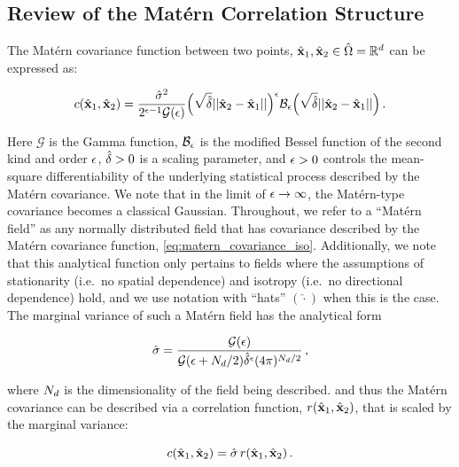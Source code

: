 \subsection{Review of the Mat\'ern Correlation Structure}
\label{ssec:matern_review}

The Mat\'ern covariance function between two points, $\hat{\mathbf{x}}_1,\hat{\mathbf{x}}_2\in\hat{\Omega} =
\mathbb{R}^{d}$ can be expressed as:
\begin{linenomath*}\begin{equation}
    c(\hat{\mathbf{x}}_1,\hat{\mathbf{x}}_2) = \dfrac{\hat{\sigma}^2}{2^{\epsilon-1}
    \mathcal{G}(\epsilon)}
    \Big(\sqrt{\hat{\delta}} ||\hat{\mathbf{x}}_2-\hat{\mathbf{x}}_1||\Big)^{\epsilon}
    \mathcal{B}_{\epsilon}
    \Big(\sqrt{\hat{\delta}} ||\hat{\mathbf{x}}_2-\hat{\mathbf{x}}_1||\Big) \, .
    \label{eq:matern_covariance_iso}
\end{equation}\end{linenomath*}
Here
$\mathcal{G}$ is the Gamma function,
$\mathcal{B}_{\epsilon}$ is the modified
Bessel function of the second kind and order $\epsilon$,
$\hat{\delta}>0$ is a scaling parameter, and $\epsilon>0$
controls the mean-square differentiability of the underlying statistical process
described by the Mat\'ern covariance.
We note that in the limit of $\epsilon\rightarrow\infty$, the Mat\'ern-type
covariance becomes a classical Gaussian.
Throughout, we refer to a ``Mat\'ern field'' as any normally distributed field that has
covariance described by the Mat\'ern covariance function,
\cref{eq:matern_covariance_iso}.
Additionally, we note that this analytical function only pertains to fields where the
assumptions of stationarity (i.e.\ no spatial dependence) and isotropy (i.e.\ no
directional dependence) hold, and we use notation with ``hats'' $(\hat{\cdot})$
when this is the case.
The marginal variance of such a Mat\'ern field has the analytical form
\begin{linenomath*}\begin{equation}
    \hat{\sigma} = \dfrac{\mathcal{G}(\epsilon)}{
        \mathcal{G}(\epsilon + N_{d}/2)
        \hat{\delta}^{\epsilon}
        (4\pi)^{N_{d}/2}
    } \, ,
    \label{eq:matern_variance}
\end{equation}\end{linenomath*}
where $N_{d}$ is the dimensionality of the field being described.
and thus the Mat\'ern covariance can be described via a correlation
function, $r(\hat{\mathbf{x}}_1, \hat{\mathbf{x}}_2)$, that is scaled by the marginal variance:
\begin{linenomath*}\begin{equation*}
    c(\hat{\mathbf{x}}_1, \hat{\mathbf{x}}_2) = \hat{\sigma}\,r(\hat{\mathbf{x}}_1, \hat{\mathbf{x}}_2) \, .
\end{equation*}\end{linenomath*}


